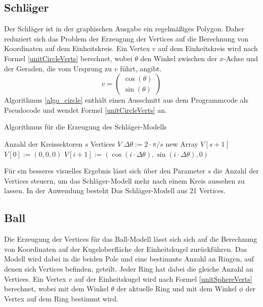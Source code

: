 \subsection{Schläger}
%
Der Schläger ist in der graphischen Ausgabe ein regelmäßiges Polygon. Daher reduziert sich das Problem der Erzeugung der Vertices auf die Berechnung von Koordinaten auf dem Einheitskreis. Ein Vertex $v$ auf dem Einheitskreis wird nach Formel \ref{unitCircleVerts} berechnet, wobei $\theta$ den Winkel zwischen der $x$-Achse und der Geraden, die vom Ursprung zu $v$ führt, angibt.
\begin{equation}
	\label{unitCircleVerts}
	v=\begin{pmatrix} \cos (\theta) \\ \sin (\theta) \end{pmatrix}
\end{equation}
Algorithmus \ref{algo_circle} enthält einen Ausschnitt aus dem Programmcode als Pseudocode und wendet Formel \ref{unitCircleVerts} an.

\begin{algorithm}[t]
	\centering
	\caption{Algorithmus für die Erzeugung des Schläger-Modells} \label{algo_circle}
	\begin{algorithmic}
		\REQUIRE Anzahl der Kreissektoren $s$
		\ENSURE Vertices $V$
		\STATE $\Delta\theta := 2\cdot\pi/s$
		\STATE new Array $V[s+1]$
		\STATE $V[0] := (0,0,0)$
		\STATE $V[i+1] := (\cos(i\cdot\Delta\theta), \sin(i\cdot\Delta\theta), 0)$
		\ENDFOR
	\end{algorithmic}
\end{algorithm}

Für ein besseres visuelles Ergebnis lässt sich über den Parameter $s$ die Anzahl der Vertices steuern, um das Schläger-Modell mehr nach einem Kreis aussehen zu lassen. In der Anwendung besteht Das Schläger-Modell aus 21 Vertices.

\subsection{Ball}
%
Die Erzeugung der Vertices für das Ball-Modell lässt sich sich auf die Berechnung von Koordinaten auf der Kugeloberfläche der Einheitskugel zurückführen. Das Modell wird dabei in die beiden Pole und eine bestimmte Anzahl an Ringen, auf denen sich Vertices befinden, geteilt. Jeder Ring hat dabei die gleiche Anzahl an Vertices. Ein Vertex $v$ auf der Einheitskugel wird nach Formel \ref{unitSphereVerts} berechnet, wobei mit dem Winkel $\theta$ der aktuelle Ring und mit dem Winkel $\phi$ der Vertex auf dem Ring bestimmt wird.

